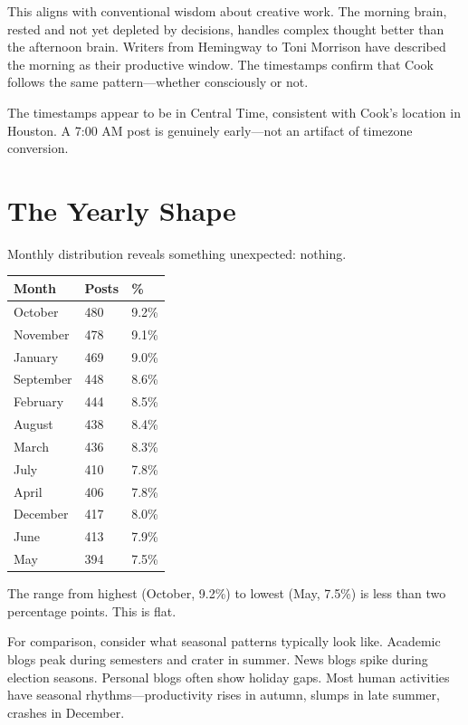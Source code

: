 This aligns with conventional wisdom about creative work. The morning brain, rested and not yet depleted by decisions, handles complex thought better than the afternoon brain. Writers from Hemingway to Toni Morrison have described the morning as their productive window. The timestamps confirm that Cook follows the same pattern—whether consciously or not.

The timestamps appear to be in Central Time, consistent with Cook's location in Houston. A 7:00 AM post is genuinely early—not an artifact of timezone conversion.

\bigskip

\section*{The Yearly Shape}

Monthly distribution reveals something unexpected: nothing.

\begin{center}
\begin{tabular}{lll}
\toprule
\textbf{Month} & \textbf{Posts} & \textbf{\%} \\
\midrule
October & 480 & 9.2\% \\
November & 478 & 9.1\% \\
January & 469 & 9.0\% \\
September & 448 & 8.6\% \\
February & 444 & 8.5\% \\
August & 438 & 8.4\% \\
March & 436 & 8.3\% \\
July & 410 & 7.8\% \\
April & 406 & 7.8\% \\
December & 417 & 8.0\% \\
June & 413 & 7.9\% \\
May & 394 & 7.5\% \\
\bottomrule
\end{tabular}
\end{center}

The range from highest (October, 9.2\%) to lowest (May, 7.5\%) is less than two percentage points. This is flat.

For comparison, consider what seasonal patterns typically look like. Academic blogs peak during semesters and crater in summer. News blogs spike during election seasons. Personal blogs often show holiday gaps. Most human activities have seasonal rhythms—productivity rises in autumn, slumps in late summer, crashes in December.

